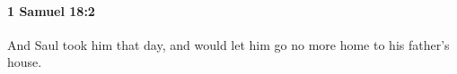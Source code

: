 
		\paragraph{1 Samuel 18:2} %
			\label{1SAMUEL-18-2}

			And Saul took him that day, and would let him go no more home to his father’s house.


